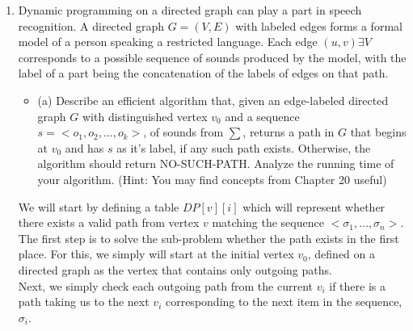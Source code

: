 \documentclass{article}
\begin{document}
\begin{enumerate}
\newpage 
\item Dynamic programming on a directed graph can play a part in speech recognition. A directed graph $G = (V,E)$ with labeled edges forms a formal model of a person speaking a restricted language. Each edge $(u,v) \exists V$ corresponds to a possible sequence of sounds produced by the model, with the label of a part being the concatenation of the labels of edges on that path. 
\begin{itemize}
    \item (a) Describe an efficient algorithm that, given an edge-labeled directed graph $G$ with distinguished vertex $v_0$ and a sequence $s=<o_1, o_2, \dots, o_k>$, of sounds from $\sum$, returns a path in $G$ that begins at $v_0$ and has $s$ as it's label, if any such path exists. Otherwise, the algorithm should return NO-SUCH-PATH. Analyze the running time of your algorithm. (Hint: You may find concepts from Chapter 20 useful)
\end{itemize}
We will start by defining a table $DP[v][i]$ which will represent whether there exists a valid path from vertex $v$ matching the sequence $<\sigma_1, \dots, \sigma_n>$. \\
\newline 
The first step is to solve the sub-problem whether the path exists in the first place. For this, we simply will start at the initial vertex $v_0$, defined on a directed graph as the vertex that contains only outgoing paths. \\
Next, we simply check each outgoing path from the current $v_i$ if there is a path taking us to the next $v_i$ corresponding to the next item in the sequence, $\sigma_i$. 


\end{enumerate}
\end{document}
